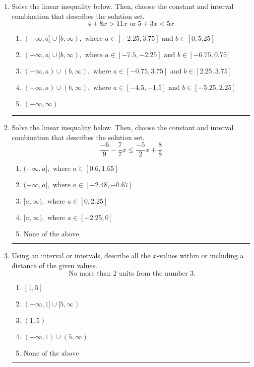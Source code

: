 \documentclass[14pt]{extbook}
\newcommand{\litem}[1]{\item#1\hspace*{-1cm}\rule{\textwidth}{0.4pt}}
\begin{document}
\begin{enumerate}
\litem{
Solve the linear inequality below. Then, choose the constant and interval combination that describes the solution set.\[ 4 + 8 x > 11 x \text{ or } 5 + 3 x < 5 x \]\begin{enumerate}[label=\Alph*.]
\item \( (-\infty, a] \cup [b, \infty), \text{ where } a \in [-2.25, 3.75] \text{ and } b \in [0, 5.25] \)
\item \( (-\infty, a] \cup [b, \infty), \text{ where } a \in [-7.5, -2.25] \text{ and } b \in [-6.75, 0.75] \)
\item \( (-\infty, a) \cup (b, \infty), \text{ where } a \in [-0.75, 3.75] \text{ and } b \in [2.25, 3.75] \)
\item \( (-\infty, a) \cup (b, \infty), \text{ where } a \in [-4.5, -1.5] \text{ and } b \in [-5.25, 2.25] \)
\item \( (-\infty, \infty) \)

\end{enumerate} }
\litem{
Solve the linear inequality below. Then, choose the constant and interval combination that describes the solution set.\[ \frac{-6}{9} - \frac{7}{7} x \leq \frac{-5}{2} x + \frac{8}{8} \]\begin{enumerate}[label=\Alph*.]
\item \( (-\infty, a], \text{ where } a \in [0.6, 1.65] \)
\item \( (-\infty, a], \text{ where } a \in [-2.48, -0.67] \)
\item \( [a, \infty), \text{ where } a \in [0, 2.25] \)
\item \( [a, \infty), \text{ where } a \in [-2.25, 0] \)
\item \( \text{None of the above}. \)

\end{enumerate} }
\litem{
Using an interval or intervals, describe all the $x$-values within or including a distance of the given values.\[ \text{ No more than } 2 \text{ units from the number } 3. \]\begin{enumerate}[label=\Alph*.]
\item \( [1, 5] \)
\item \( (-\infty, 1] \cup [5, \infty) \)
\item \( (1, 5) \)
\item \( (-\infty, 1) \cup (5, \infty) \)
\item \( \text{None of the above} \)


\end{enumerate}}
\end{enumerate}
\end{document}
